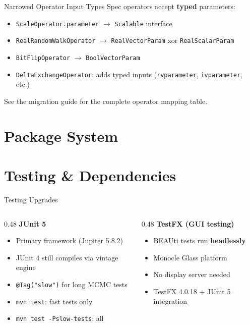 \documentclass[aspectratio=169,11pt]{beamer}
\newcommand{\code}[1]{\texttt{#1}}
\begin{document}
\begin{frame}{Narrowed Operator Input Types}
Spec operators accept \textbf{typed} parameters:

\vspace{0.5em}
\begin{itemize}
\item \code{ScaleOperator.parameter} $\to$ \code{Scalable} interface
\item \code{RealRandomWalkOperator} $\to$ \code{RealVectorParam} xor \code{RealScalarParam}
\item \code{BitFlipOperator} $\to$ \code{BoolVectorParam}
\item \code{DeltaExchangeOperator}: adds typed inputs (\code{rvparameter}, \code{ivparameter}, etc.)
\end{itemize}
\vspace{1em}
See the migration guide for the complete operator mapping table.
\end{frame}

\section{Package System}



\section{Testing \& Dependencies}

\begin{frame}{Testing Upgrades}
\begin{columns}[T]
\begin{column}{0.48\textwidth}
\textbf{JUnit 5}
\begin{itemize}
\item Primary framework (Jupiter 5.8.2)
\item JUnit 4 still compiles via vintage engine
\item \code{@Tag("slow")} for long MCMC tests
\item \code{mvn test}: fast tests only
\item \code{mvn test -Pslow-tests}: all
\end{itemize}
\end{column}
\begin{column}{0.48\textwidth}
\textbf{TestFX (GUI testing)}
\begin{itemize}
\item BEAUti tests run \textbf{headlessly}
\item Monocle Glass platform
\item No display server needed
\item TestFX 4.0.18 + JUnit 5 integration
\end{itemize}
\end{column}
\end{columns}
\end{frame}
\end{document}
